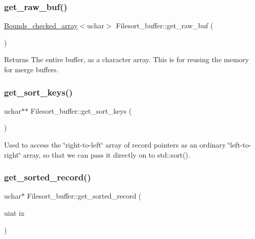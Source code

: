 \subsubsection{\texorpdfstring{get\+\_\+raw\+\_\+buf()}{get\_raw\_buf()}}
{\footnotesize\ttfamily \mbox{\hyperlink{classBounds__checked__array}{Bounds\+\_\+checked\+\_\+array}}$<$uchar$>$ Filesort\+\_\+buffer\+::get\+\_\+raw\+\_\+buf (\begin{DoxyParamCaption}{ }\end{DoxyParamCaption})\hspace{0.3cm}{\ttfamily [inline]}}

\begin{DoxyReturn}{Returns}
The entire buffer, as a character array. This is for reusing the memory for merge buffers. 
\end{DoxyReturn}
\mbox{\label{classFilesort__buffer_ab833d1ea135e1651b55087cbe923dbf5}} 
\subsubsection{\texorpdfstring{get\+\_\+sort\+\_\+keys()}{get\_sort\_keys()}}
{\footnotesize\ttfamily uchar$\ast$$\ast$ Filesort\+\_\+buffer\+::get\+\_\+sort\+\_\+keys (\begin{DoxyParamCaption}{ }\end{DoxyParamCaption})\hspace{0.3cm}{\ttfamily [inline]}}

Used to access the \char`\"{}right-\/to-\/left\char`\"{} array of record pointers as an ordinary \char`\"{}left-\/to-\/right\char`\"{} array, so that we can pass it directly on to std\+::sort(). \mbox{\label{classFilesort__buffer_aaa6a3d39db88fecaec624037485fd727}} 
\subsubsection{\texorpdfstring{get\+\_\+sorted\+\_\+record()}{get\_sorted\_record()}}
{\footnotesize\ttfamily uchar$\ast$ Filesort\+\_\+buffer\+::get\+\_\+sorted\+\_\+record (\begin{DoxyParamCaption}\item[{uint}]{ix }\end{DoxyParamCaption})\hspace{0.3cm}{\ttfamily [inline]}}

